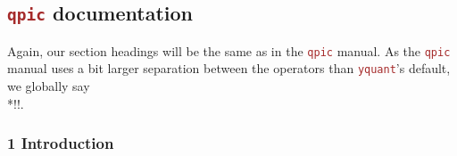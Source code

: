 \documentclass{scrartcl}
\def\pkg#1{\textcolor{brown}{\texttt{#1}}}
\def\Yquant{\pkg{yquant}}
\begin{document}
      \subsection[\texorpdfstring{\pkg{qpic}}{qpic} documentation]{\pkg{qpic} documentation}
      \begingroup
         Again, our section headings will be the same as in the \pkg{qpic} manual.
         As the \pkg{qpic} manual uses a bit larger separation between the operators than \Yquant's default, we globally say\\*\tex!!.

         \subsubsection{1 Introduction}
\end{document}
